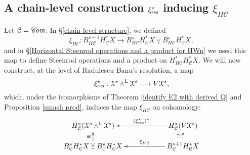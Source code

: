 \documentclass[11pt]{amsart} \renewcommand{\baselinestretch}{1.2}
\theoremstyle{plain}
\numberwithin{equation}{section} %
\theoremstyle{plain}
\numberwithin{equation}{chapter} %
\renewcommand{\to}{\longrightarrow}
\newcommand{\from}{\longleftarrow}
\newcommand{\scrC}{\mathscr{C}}
\newcommand{\calx}{\mathcal{X}}
\newcommand{\calc}{\mathcal{C}}
\newcommand{\HA}[1]{H#1}
\newcommand{\algs}{{\scrC\!\textit{\normalfont\textit{om}}}}
\newcommand{\Lsmashprod}{\barwedge^\mathrm{L}}%
\newcommand{\smashcoprod}{\veebar}%
\newcommand{\SubsectionOrSection}[1]{\subsection{#1}}
\begin{document}
\begin{Operations on the Bousfield-Kan spectral sequence}
\SubsectionOrSection{A chain-level construction $\xi_\textup{res}^\star$ inducing $\xi_{\HA{\calc}}$}\label{sec xires}
Let $\calc=\algs$. In \S\ref{chain level structure}, we defined
\[\xi_{\HA{\calc}}:B^{s+1}_{\HA{\calc}}H^*_{\calc}X\to B^{s}_{\HA{\calc}}H^*_{\calc}X\smashcoprod B^{s}_{\HA{\calc}}H^*_{\calc}X,\]
and in \S\ref{Horizontal Steenrod operations and a product for HWn} we used this map to define Steenrod operations and a product on $H^{*}_{\HA{\calc}}H^*_{\calc}X$. 
We will now construct, at the level of Radulescu-Banu's resolution, a map
\[\xi_\textup{res}^\star:\calx^s\Lsmashprod \calx^s\to V\calx^s,\]
which, under the isomorphisms of Theorem \ref{identify E2 with derived Q} and Proposition \ref{smash prod}, induces the map $\xi_{\HA{\calc}}$ on cohomology:
\[\xymatrix@R=4mm@C=20mm{
H^*_{\calc}(\calx^s\Lsmashprod \calx^s)&\ar[l]_-{(\xi_\textup{res}^\star)^*}
H^*_{\calc}(V\calx^s)\\%
B^{s}_\calc H^*_\calc X\smashcoprod B^{s}_\calc H^*_\calc X\ar[u]^-{\cong}&%
B^{s+1}_\calc H^*_\calc X\ar[l]_-{\xi_{\HA{\calc}}}\ar[u]^-{\cong}%
}\]



\end{Operations on the Bousfield-Kan spectral sequence}
\end{document}
